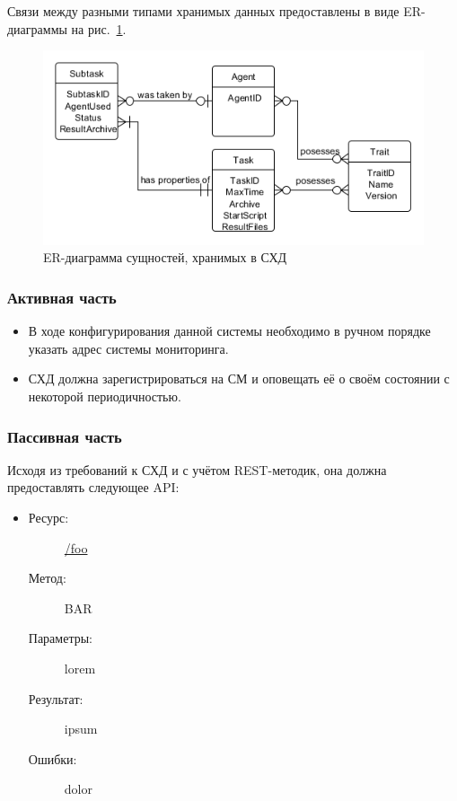 \documentclass[a4paper,12pt]{report}
\numberwithin{equation}{section}
\begin{document}
Связи между разными типами хранимых данных предоставлены в виде ER-диаграммы на рис.~\ref{fig:db-er}.

\begin{figure}[b]
  \centering
  \includegraphics[width=.9\linewidth]{diagrams/db/er}
  \caption{ER-диаграмма сущностей, хранимых в СХД}
  \label{fig:db-er}
\end{figure}

\subsubsection{Активная часть}
\begin{itemize}
  \item В ходе конфигурирования данной системы необходимо в ручном порядке указать адрес системы мониторинга.
  \item СХД должна зарегистрироваться на СМ и оповещать её о своём состоянии с некоторой периодичностью.
\end{itemize}

\subsubsection{Пассивная часть}
Исходя из требований к СХД и с учётом REST-методик, она должна предоставлять следующее API:

\begin{itemize}
  \item
  \begin{description}
    \item[Ресурс:] \url{/foo}
    \item[Метод:] BAR
    \item[Параметры:] lorem
    \item[Результат:] ipsum
    \item[Ошибки:] dolor
  \end{description}
\end{itemize}
\end{document}
